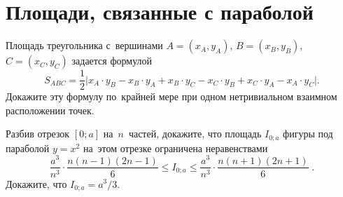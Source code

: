 
\section*{Площади, связанные с параболой}



\setcounter{figure}{0}

\begin{problems}

\item
Площадь треугольника с~вершинами
$A = (x_{A}, y_{A})$, $B = (x_{B}, y_{B})$, $C = (x_{C}, y_{C})$
задается формулой
\[
    S_{ABC}
=
    \frac{1}{2}
    \bigl \lvert
          x_{A} \cdot y_{B} - x_{B} \cdot y_{A}
        + x_{B} \cdot y_{C} - x_{C} \cdot y_{B}
        + x_{C} \cdot y_{A} - x_{A} \cdot y_{C}
    \bigr \rvert
.\]
Докажите эту формулу по~крайней мере при одном нетривиальном взаимном
расположении точек.

\end{problems}

\begin{minipage}{0.795\linewidth} \begin{problems}
\item
\subproblem
Разбив отрезок $[0; a]$ на~$n$~частей, докажите, что площадь $I_{0;a}$ фигуры
под параболой $y = x^2$ на~этом отрезке ограничена неравенствами
\[
    \frac{a^3}{n^3} \cdot
    \frac{n (n - 1) (2 n - 1)}{6}
\leq
    I_{0;a}
\leq
    \frac{a^3}{n^3} \cdot
    \frac{n (n + 1) (2 n + 1)}{6}
\;.\]
\subproblem
Докажите, что $I_{0;a} = a^3 / 3$.
\end{problems} \end{minipage}
\hfill
\begin{minipage}{0.195\linewidth}
\end{minipage}

